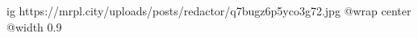  
 
 
 
 

\ifcmt
  ig https://mrpl.city/uploads/posts/redactor/q7bugz6p5yco3g72.jpg
  @wrap center
  @width 0.9
\fi
